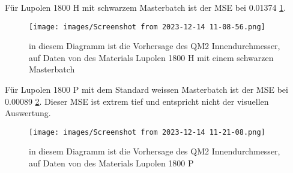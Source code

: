 Für Lupolen 1800 H mit schwarzem Masterbatch ist der MSE bei 0.01374 \ref{fig:Test1800S}.

\begin{figure} 
   
  \texttt{[image: images/Screenshot from 2023-12-14 11-08-56.png]}
  \caption{in diesem Diagramm ist die Vorhersage des QM2 Innendurchmesser, auf Daten von des Materials Lupolen 1800 H mit einem schwarzen Masterbatch}
  \label{fig:Test1800S}
\end{figure}

Für Lupolen 1800 P mit dem Standard weissen Masterbatch ist der MSE bei 0.00089 \ref{fig:Test1800P}. Dieser MSE ist extrem tief und entspricht nicht der visuellen Auswertung.

\begin{figure} 
   
  \texttt{[image: images/Screenshot from 2023-12-14 11-21-08.png]}
  \caption{in diesem Diagramm ist die Vorhersage des QM2 Innendurchmesser, auf Daten von des Materials Lupolen 1800 P}
  \label{fig:Test1800P}
\end{figure}
